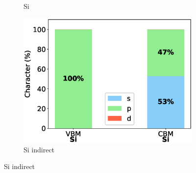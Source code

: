 \begin{figure}[!ht]
\begin{subfigure}{0.3\textwidth}
  \caption{Si}
\end{subfigure}
\begin{subfigure}{0.3\textwidth}
  \includegraphics[width=\linewidth]{images/si_indirect_3d_composition.eps}
  \caption{Si indirect}
\end{subfigure}\hfil %

\medskip


\end{figure}
